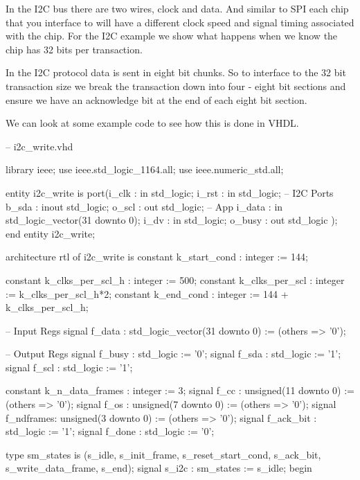 In the \ac{I2C} bus there are two wires, clock and data. And similar to \ac{SPI} each chip that you interface to will have a different clock speed and signal timing associated with the chip. For the \ac{I2C} example we show what happens when we know the chip has 32 bits per transaction. 	
	
In the \ac{I2C} protocol data is sent in eight bit chunks. So to interface to the 32 bit transaction size we break the transaction down into four - eight bit sections and ensure we have an acknowledge bit at the end of each eight bit section. 
	
We can look at some example code to see how this is done in \ac{VHDL}.	

\begin{VHDLlisting}[tabsize=4]
-- i2c_write.vhd

library ieee;
    use ieee.std_logic_1164.all;
    use ieee.numeric_std.all;


entity i2c_write is
    port(i_clk        : in    std_logic;
         i_rst        : in    std_logic;
         -- I2C Ports 
         b_sda        : inout std_logic;
         o_scl        :   out std_logic;
         -- App 
         i_data       : in    std_logic_vector(31 downto 0);
         i_dv         : in    std_logic;
         o_busy       :   out std_logic
    );
end entity i2c_write;

architecture rtl of i2c_write is 
    constant k_start_cond     : integer := 144;
	
    constant k_clks_per_scl_h : integer := 500;
    constant k_clks_per_scl   : integer := k_clks_per_scl_h*2;
	constant k_end_cond       : integer := 144 + k_clks_per_scl_h;
	
    -- Input Regs
    signal f_data    : std_logic_vector(31 downto 0) := (others => '0');
    	
    -- Output Regs
    signal f_busy    : std_logic := '0';
    signal f_sda     : std_logic := '1';
    signal f_scl     : std_logic := '1';

	constant k_n_data_frames : integer := 3;
    signal f_cc      : unsigned(11 downto 0) := (others => '0');
    signal f_os      : unsigned(7 downto 0) := (others => '0');
	signal f_ndframes: unsigned(3 downto 0) := (others => '0');
    signal f_ack_bit : std_logic := '1';
	signal f_done    : std_logic := '0';

    type sm_states is (s_idle, s_init_frame, s_reset_start_cond, s_ack_bit, s_write_data_frame, s_end);
    signal s_i2c  : sm_states := s_idle;
begin


\end{VHDLlisting}
